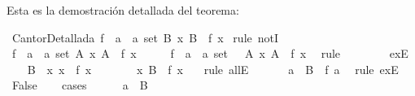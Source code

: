 \begin{isabellebody}
\begin{isamarkuptext}
Esta es la demostración detallada del teorema:%
\end{isamarkuptext}\isamarkuptrue%
\isamarkupfalse%
\ CantorDetallada{\isacharcolon}\ {\isachardoublequoteopen}{\isasymnexists}f\ {\isacharcolon}{\isacharcolon}\ {\isacharprime}a\ {\isasymRightarrow}\ {\isacharprime}a\ set{\isachardot}\ {\isasymforall}B{\isachardot}\ {\isasymexists}x{\isachardot}\ B\ {\isacharequal}\ f\ x{\isachardoublequoteclose}\isanewline
%
\isadelimproof
%
\endisadelimproof
%
\isatagproof
{}\isamarkupfalse%
\ {\isacharparenleft}rule\ notI{\isacharparenright}\isanewline
\ \ \isamarkupfalse%
\ {\isachardoublequoteopen}{\isasymexists}f\ {\isacharcolon}{\isacharcolon}\ {\isacharprime}a\ {\isasymRightarrow}\ {\isacharprime}a\ set{\isachardot}\ {\isasymforall}A{\isachardot}\ {\isasymexists}x{\isachardot}\ A\ {\isacharequal}\ f\ x{\isachardoublequoteclose}\isanewline
\ \ \isamarkupfalse%
\ \isamarkupfalse%
\ f\ {\isacharcolon}{\isacharcolon}\ {\isachardoublequoteopen}{\isacharprime}a\ {\isasymRightarrow}\ {\isacharprime}a\ set{\isachardoublequoteclose}\ \ {\isacharasterisk}{\isacharcolon}\ {\isachardoublequoteopen}{\isasymforall}A{\isachardot}\ {\isasymexists}x{\isachardot}\ A\ {\isacharequal}\ f\ x{\isachardoublequoteclose}\ \isamarkupfalse%
\ {\isacharparenleft}rule\isanewline
\ \ \ \ \ \ \ \ exE{\isacharparenright}\isanewline
\ \ \isamarkupfalse%
\ {\isacharquery}B\ {\isacharequal}\ {\isachardoublequoteopen}{\isacharbraceleft}x{\isachardot}\ x\ {\isasymnotin}\ f\ x{\isacharbraceright}{\isachardoublequoteclose}\isanewline
\ \ \isamarkupfalse%
\ {\isacharasterisk}\ \isamarkupfalse%
\ {\isachardoublequoteopen}\ {\isasymexists}x{\isachardot}\ {\isacharquery}B\ {\isacharequal}\ f\ x\ {\isachardoublequoteclose}\ \isamarkupfalse%
\ {\isacharparenleft}rule\ allE{\isacharparenright}\isanewline
\ \ \isamarkupfalse%
\ \ \isamarkupfalse%
\ a\ \ {}{\isacharcolon}{\isachardoublequoteopen}{\isacharquery}B\ {\isacharequal}\ f\ a{\isachardoublequoteclose}\ \isamarkupfalse%
\ {\isacharparenleft}rule\ exE{\isacharparenright}\isanewline
\ \ \isamarkupfalse%
\ False\isanewline
\ \ \isamarkupfalse%
\ {\isacharparenleft}cases{\isacharparenright}\isanewline
\ \ \ \ \isamarkupfalse%
\ {\isachardoublequoteopen}a\ {\isasymin}\ {\isacharquery}B{\isachardoublequoteclose}\ \ \isanewline

\end{isabellebody}
